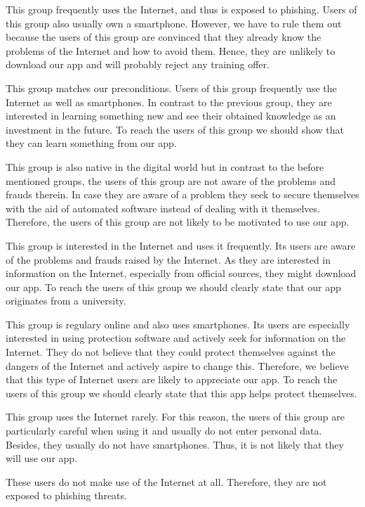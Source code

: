 \begin{description}[leftmargin=0cm]
\item[Digital Souver\"{a}ne:] This group frequently uses the Internet, and thus is exposed to phishing. Users of this group also usually own a smartphone. However, we have to rule them out because the users of this group are convinced that they already know the problems of the Internet and how to avoid them. Hence, they are unlikely to download our app and  will probably reject any training offer.
\item[Effizienzorientierte Performer:] This group matches our preconditions.
Users of this group frequently use the Internet as well as smartphones. In contrast to the previous group, they are interested in learning something new and see their obtained knowledge as an investment in the future. To reach the users of this group we should show that they can learn something from our app.
\item[Unbek\"{u}mmerte Hedonisten:] This group is also native in the digital world but in contrast to the before mentioned groups, the users of this group are not aware of the problems and frauds therein. In case they are aware of a problem they seek to secure themselves with the aid of automated software instead of dealing with it themselves. Therefore, the users of this group are not likely to be motivated to use our app.
\item[Postmaterielle Skeptiker:] This group is interested in the Internet and uses it frequently. Its users are aware of the problems and frauds raised by the Internet. As they are interested in information on the Internet, especially from official sources, they might download our app. To reach the users of this group we should clearly state that our app originates from a university.
\item[Verantwortungsbedachte Etablierte:] This group is regulary online and also uses smartphones. Its users are especially interested in using protection software and actively seek for information on the Internet. They do not believe that they could protect themselves against the dangers of the Internet and actively aspire to change this. Therefore, we believe that this type of Internet users are likely to appreciate our app. To reach the users of this group we should clearly state that this app helps protect themselves.
\item[Ordnungsfordernde Internet-Laien:] This group uses the Internet rarely. For this reason, the users of this group are particularly careful when using it and usually do not enter personal data. Besides, they usually do not have smartphones. Thus, it is not likely that they will use our app. 
\item[Internetferne Verunsicherte:] These users do not make use of the Internet at all. Therefore, they are not exposed to phishing threats.
\end{description}
